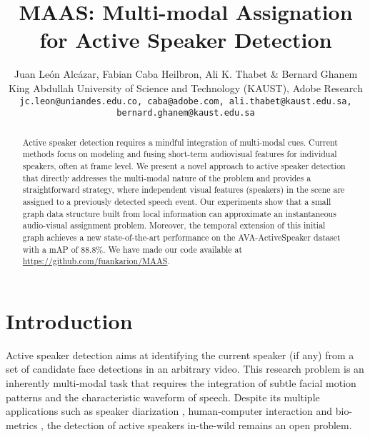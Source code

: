 \documentclass[10pt,twocolumn,letterpaper]{article}
\begin{document}
\title{\vspace{-0.35cm} MAAS: Multi-modal Assignation for Active Speaker Detection \vspace{-0.35cm}}


\author{
    Juan León Alcázar, Fabian Caba Heilbron, Ali K. Thabet \& Bernard Ghanem\\
    \small  King Abdullah University of Science and Technology (KAUST), Adobe Research\\
    {\tt\small jc.leon@uniandes.edu.co, caba@adobe.com, ali.thabet@kaust.edu.sa, bernard.ghanem@kaust.edu.sa}
}

\maketitle
\ificcvfinal\thispagestyle{empty}\fi

\begin{abstract}
    Active speaker detection requires a mindful integration of multi-modal cues. Current methods focus on modeling and fusing short-term audiovisual features for individual speakers, often at frame level. We present a novel approach to active speaker detection that directly addresses the multi-modal nature of the problem and provides a straightforward strategy, where independent visual features (speakers) in the scene are assigned to a previously detected speech event. Our experiments show that a small graph data structure built from local information can approximate an instantaneous audio-visual assignment problem. Moreover, the temporal extension of this initial graph achieves a new state-of-the-art performance on the AVA-ActiveSpeaker dataset with a mAP of 88.8\%. We have made our code available at \url{https://github.com/fuankarion/MAAS}.
\end{abstract}



\section{Introduction}
\label{sec:intro}

Active speaker detection aims at identifying the current speaker (if any) from a set of candidate face detections in an arbitrary video. This research problem is an inherently multi-modal task that requires the integration of subtle facial motion patterns and the characteristic waveform of speech. Despite its multiple applications such as speaker diarization \cite{anguera2012speaker,  shum2013unsupervised, tranter2006overview, wang2018speaker}, human-computer interaction \cite{garcia2017speaker, yu2017active} and bio-metrics \cite{nagrani2018seeing, ravanelli2018speaker}, the detection of active speakers in-the-wild remains an open problem. 
\end{document}
